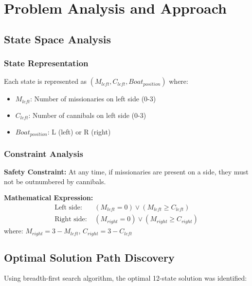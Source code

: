\documentclass[12pt,letterpaper]{article}
\begin{document}
\newpage

\section{Problem Analysis and Approach}

\subsection{State Space Analysis}

\subsubsection{State Representation}
Each state is represented as $(M_{left}, C_{left}, Boat_{position})$ where:
\begin{itemize}
    \item $M_{left}$: Number of missionaries on left side (0-3)
    \item $C_{left}$: Number of cannibals on left side (0-3)
    \item $Boat_{position}$: L (left) or R (right)
\end{itemize}

\subsubsection{Constraint Analysis}
\textbf{Safety Constraint:} At any time, if missionaries are present on a side, they must not be outnumbered by cannibals.

\textbf{Mathematical Expression:}
\begin{align}
\text{Left side: } &(M_{left} = 0) \lor (M_{left} \geq C_{left}) \\
\text{Right side: } &(M_{right} = 0) \lor (M_{right} \geq C_{right})
\end{align}
where: $M_{right} = 3 - M_{left}$, $C_{right} = 3 - C_{left}$

\subsection{Optimal Solution Path Discovery}
Using breadth-first search algorithm, the optimal 12-state solution was identified:
\end{document}
